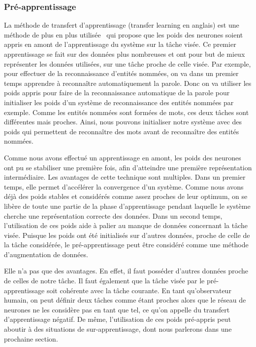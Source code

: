 \subsubsection{Pré-apprentissage}
La méthode de transfert d'apprentissage (transfer learning en anglais) est une méthode de plus en plus utilisée~\cite{Pan2010,Weiss2016} qui propose que les poids des neurones soient appris en amont de l'apprentissage du système sur la tâche visée. Ce premier apprentissage se fait sur des données plus nombreuses et ont pour but de mieux représenter les données utilisées, sur une tâche proche de celle visée. Par exemple, pour effectuer de la reconnaissance d'entités nommées, on va dans un premier temps apprendre à reconnaître automatiquement la parole. Donc on va utiliser les poids appris pour faire de la reconnaissance automatique de la parole pour initialiser les poids d'un système de reconnaissance des entités nommées par exemple. Comme les entités nommées sont formées de mots, ces deux tâches sont différentes mais proches. Ainsi, nous pouvons initialiser notre système avec des poids qui permettent de reconnaître des mots avant de reconnaître des entités nommées.

Comme nous avons effectué un apprentissage en amont, les poids des neurones ont pu se stabiliser une première fois, afin d'atteindre une première représentation intermédiaire. Les avantages de cette technique sont multiples. Dans un premier temps, elle permet d’accélérer la convergence d'un système. Comme nous avons déjà des poids stables et considérés comme assez proches de leur optimum, on se libère de toute une partie de la phase d'apprentissage pendant laquelle le système cherche une représentation correcte des données. Dans un second temps, l'utilisation de ces poids aide à palier au manque de données concernant la tâche visée. Puisque les poids ont été initialisés sur d'autres données, proche de celle de la tâche considérée, le pré-apprentissage peut être considéré comme une méthode d'augmentation de données.

Elle n'a pas que des avantages. En effet, il faut posséder d'autres données proche de celles de notre tâche. Il faut également que la tâche visée par le pré-apprentissage soit cohérente avec la tâche courante. En tant qu'observateur humain, on peut définir deux tâches comme étant proches alors que le réseau de neurones ne les considère pas en tant que tel, ce qu'on appelle du transfert d'apprentissage négatif. De même, l'utilisation de ces poids pré-appris peut aboutir à des situations de sur-apprentissage, dont nous parlerons dans une prochaine section.

